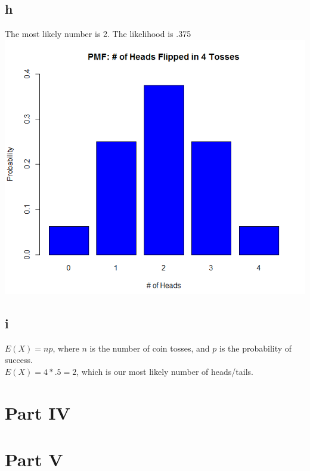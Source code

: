 \documentclass[10pt,letterpaper]{article}
\begin{document}
\subsection*{h}
The most likely number is 2. The likelihood is .375\\
\includegraphics[scale=.75]{CoinPMF}

\subsection*{i}
$E(X)=np$, where $n$ is the number of coin tosses, and $p$ is the probability
of success.\\
$E(X)=4*.5=2$, which is our most likely number of heads/tails.

\section*{Part IV}

\section*{Part V}
\end{document}
